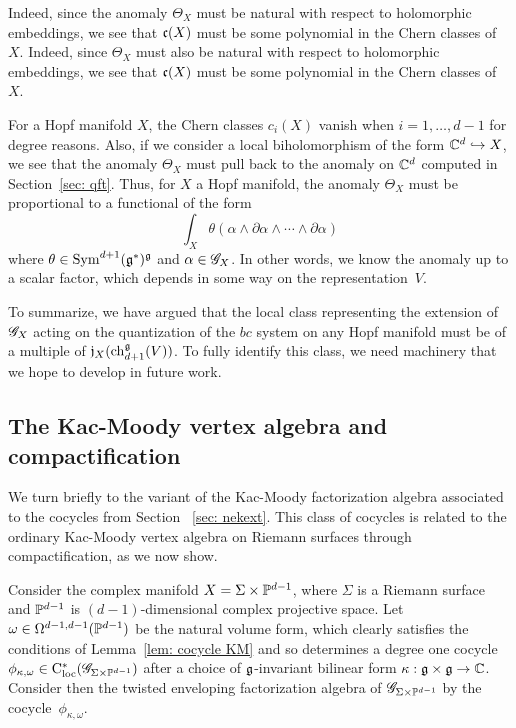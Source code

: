 Indeed, since the anomaly $\Theta_X$ must be natural with respect to holomorphic embeddings, we see that $\mathfrak c(X)$ must be some polynomial in the Chern classes of $X$. 
Indeed, since $\Theta_X$ must also be natural with respect to holomorphic embeddings, we see that $\mathfrak c(X)$ must be some polynomial in the Chern classes of~$X$. 

For a Hopf manifold $X$, the Chern classes $c_i(X)$ vanish when $i=1,\ldots,d-1$ for degree reasons. 
Also, if we consider a local biholomorphism of the form $\mathbb C^d \hookrightarrow X$, we see that the anomaly $\Theta_X$ must pull back to the anomaly on $\mathbb C^d$ computed in Section~\ref{sec: qft}. 
Thus, for $X$ a Hopf manifold, the anomaly $\Theta_X$ must be proportional to a functional of the form
\[
\int_X \theta(\alpha \wedge \partial \alpha \wedge \cdots \wedge \partial \alpha)
\]
where $\theta \in {\rm Sym}^{d+1}(\mathfrak g^*)^\mathfrak g$ and $\alpha \in \mathscr G_X$. 
In other words, we know the anomaly up to a scalar factor, which depends in some way on the representation~$V$.

To summarize, we have argued that the local class representing the extension of $\mathscr G_X$ acting on the quantization of the $bc$ system on any Hopf manifold must be of a multiple of $\mathfrak j_X({\rm ch}_{d+1}^\mathfrak g(V))$. 
To fully identify this class, we need machinery that we hope to develop in future work. 

\subsection{The Kac-Moody vertex algebra and compactification} 

We turn briefly to the variant of the Kac-Moody factorization algebra associated to the cocycles from Section ~\ref{sec: nekext}.
This class of cocycles is related to the ordinary Kac-Moody vertex algebra on Riemann surfaces through compactification, as we now show. 

Consider the complex manifold $X = \Sigma \times \mathbb P^{d-1}$, 
where $\Sigma$ is a Riemann surface and $\mathbb P^{d-1}$ is $(d-1)$-dimensional complex projective space.
Let $\omega \in \Omega^{d-1,d-1}(\mathbb P^{d-1})$ be the natural volume form, 
which clearly satisfies the conditions of Lemma~\ref{lem: cocycle KM} and so determines a degree one cocycle $\phi_{\kappa, \omega} \in {\rm C}_{\rm loc}^*(\mathscr G_{\Sigma \times \mathbb P^{d-1}})$ after a choice of $\mathfrak g$-invariant bilinear form $\kappa : \mathfrak g \times \mathfrak g \to \mathbb C$. 
Consider then the twisted enveloping factorization algebra of $\mathscr G_{\Sigma \times \mathbb P^{d-1}}$ by the cocycle~$\phi_{\kappa, \omega}$. 

